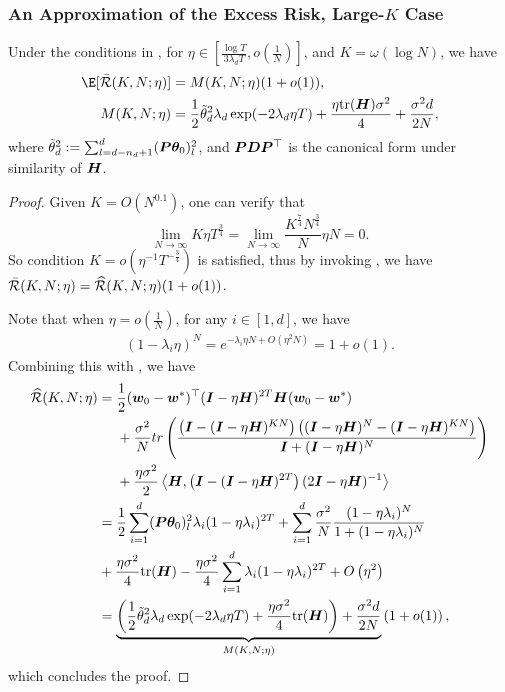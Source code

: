 \subsubsection{An Approximation of the Excess Risk, Large-$K$ Case} \label{sec:convex-loss-estimate-large-K}
\begin{lemma} \label{lem:convex-L-approx-large-K}
    Under the conditions in , for $\eta \in [\frac{\log T}{3\lambda_d T}, o\left(\frac{1}{N}\right)]$, and $K=\omega\left(\log N\right)$, we have 
    \begin{align*}
        \E[\Bar{\cR}(K, N;\eta)] &= M(K, N;\eta)(1+ o(1)),\\
        M(K, N;\eta) &= \frac{1}{2}\Tilde{\theta}_d^2 \lambda_d \exp(-2\lambda_d \eta T) + \frac{\eta\tr(\mH)\sigma^2}{4}+\frac{\sigma^2d}{2N},
    \end{align*}
    where $\Tilde{\theta}_{d}^2 := \sum_{l=d-n_d+1}^d({\bm{P}}{\bm{\theta}}_0)_{l}^2$, and ${\bm{P}}{\bm{D}}{\bm{P}}^{\top}$ is the canonical form under similarity of ${\bm{H}}$.
\end{lemma}
\begin{proof}
    Given $K = O(N^{0.1})$, one can verify that 
    $$\lim_{N\to\infty}K\eta T^{\frac{3}{4}} = \lim_{N\to\infty}\frac{K^{\frac{7}{4}}N^{\frac{3}{4}}}{N}\eta N = 0.$$ 
    So condition $K = o\left(\eta^{-1} T^{-\frac{3}{4}}\right)$ is satisfied, thus by
    invoking , we have $\Bar{\mathcal{R}}(K, N; \eta) = \widehat{\mathcal{R}}(K, N; \eta)(1+o(1))$. 

    Note that when $\eta = o\left(\frac{1}{N}\right)$, for any $i \in [1, d]$, we have
    \begin{align*}
        (1-\lambda_i\eta)^N=e^{-\lambda_i\eta N+O(\eta^2N)}=1+o(1).
    \end{align*}
    Combining this with , we have
    \begin{align}
    \widehat{\mathcal{R}}(K, N;\eta) &= \frac{1}{2}({\bm{w}}_0 - {\bm{w}}^*)^{\top} ({\bm{I}}-\eta{\bm{H}})^{2T}{\bm{H}} ({\bm{w}}_0 - {\bm{w}}^*)\notag\\
    &~~~~+\frac{\sigma^2}{N} tr\left(\frac{\left({\bm{I}} -({\bm{I}} -\eta{\bm{H}})^{KN}\right)\left(({\bm{I}} -\eta{\bm{H}})^{N} -({\bm{I}} -\eta{\bm{H}})^{KN}\right)}{{\bm{I}} + ({\bm{I}} -\eta{\bm{H}})^N}\right)\notag \\
    &~~~~+\frac{\eta\sigma^2}{2}\left\langle {\bm{H}},\left({\bm{I}} - ({\bm{I}} - \eta {\bm{H}})^{2T}\right)(2{\bm{I}}-\eta{\bm{H}})^{-1}\right\rangle \notag\\
    &= \frac{1}{2} \sum_{i=1}^d ({\bm{P}}{\bm{\theta}}_{0})_l^2 \lambda_i (1-\eta\lambda_i)^{2T} +\sum_{i=1}^d\frac{\sigma^2}{N}\frac{(1-\eta\lambda_i)^N}{1+ (1-\eta\lambda_i)^N}\notag \\
    &+ \frac{\eta\sigma^2}{4}\mathrm{tr}({\bm{H}})- \frac{\eta\sigma^2}{4}\sum_{i=1}^d\lambda_i(1-\eta\lambda_i)^{2T}+ O\left(\eta^2\right)\notag\\
    &=\underbrace{\left(\frac{1}{2}\Tilde{\theta}_d^2 \lambda_d \exp(-2\lambda_d \eta T) + \frac{\eta\sigma^2}{4}\mathrm{tr}({\bm{H}})\right)+\frac{\sigma^2d}{2N}}_{M(K,N;\eta)}\left(1 + o(1)\right) \label{equ:strong-convex-loss-approx},
\end{align}
which concludes the proof.
\end{proof}

